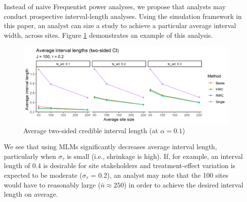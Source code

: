 \documentclass[]{article}
\begin{document}
Instead of naive Frequentist power analyses, we propose that analysts may conduct prospective interval-length analyses.
Using the simulation framework in this paper, an analyst can size a study to achieve a particular average interval width, across sites.
Figure \ref{fig:length_plot} demonstrates an example of this analysis.
\begin{figure}[ht]
	\centering
	\includegraphics[width=\textwidth]{writeup/images/length_plot.png}
	\caption{Average two-sided credible interval length (at $\alpha = 0.1$)}
	\label{fig:length_plot}
\end{figure}
We see that using MLMs significantly decreases average interval length, particularly when $\sigma_\tau$ is small (i.e., shrinkage is high).
If, for example, an interval length of 0.4 is desirable for site stakeholders and treatment-effect variation is expected to be moderate ($\sigma_\tau$ = 0.2), an analyst may note that the 100 sites would have to reasonably large ($\bar{n} \approx 250$) in order to achieve the desired interval length on average.

\end{document}
